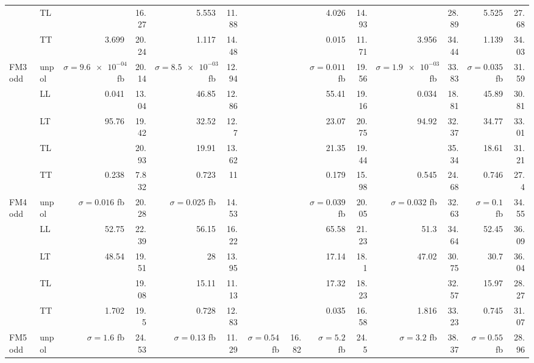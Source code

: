 \begin{table}[h]
{\begin{tabular}{llrrrrrrrrrrrr}
 & TL &  & \num{16.27} & \num{5.553} & \num{11.88} &  &  & \num{4.026} & \num{14.93} &  & \num{28.89} & \num{5.525} & \num{27.68} \\
 & TT & \num{3.699} & \num{20.24} & \num{1.117} & \num{14.48} &  &  & \num{0.015} & \num{11.71} & \num{3.956} & \num{34.44} & \num{1.139} & \num{34.03} \\
\midrule
\multirow{5}{*}{FM3odd}
 & unpol & $\sigma = \num{9.6e-04}$ fb & \num{20.14} & $\sigma = \num{8.5e-03}$ fb & \num{12.94} &  &  & $\sigma = \num{0.011}$ fb & \num{19.56} & $\sigma = \num{1.9e-03}$ fb & \num{33.83} & $\sigma = \num{0.035}$ fb & \num{31.59} \\
 & LL & \num{0.041} & \num{13.04} & \num{46.85} & \num{12.86} &  &  & \num{55.41} & \num{19.16} & \num{0.034} & \num{18.81} & \num{45.89} & \num{30.81} \\
 & LT & \num{95.76} & \num{19.42} & \num{32.52} & \num{12.7} &  &  & \num{23.07} & \num{20.75} & \num{94.92} & \num{32.37} & \num{34.77} & \num{33.01} \\
 & TL &  & \num{20.93} & \num{19.91} & \num{13.62} &  &  & \num{21.35} & \num{19.44} &  & \num{35.34} & \num{18.61} & \num{31.21} \\
 & TT & \num{0.238} & \num{7.832} & \num{0.723} & \num{11} &  &  & \num{0.179} & \num{15.98} & \num{0.545} & \num{24.68} & \num{0.746} & \num{27.4} \\
\midrule
\multirow{5}{*}{FM4odd}
 & unpol & $\sigma = \num{0.016}$ fb & \num{20.28} & $\sigma = \num{0.025}$ fb & \num{14.53} &  &  & $\sigma = \num{0.039}$ fb & \num{20.05} & $\sigma = \num{0.032}$ fb & \num{32.63} & $\sigma = \num{0.1}$ fb & \num{34.55} \\
 & LL & \num{52.75} & \num{22.39} & \num{56.15} & \num{16.22} &  &  & \num{65.58} & \num{21.23} & \num{51.3} & \num{34.64} & \num{52.45} & \num{36.09} \\
 & LT & \num{48.54} & \num{19.51} & \num{28} & \num{13.95} &  &  & \num{17.14} & \num{18.1} & \num{47.02} & \num{30.75} & \num{30.7} & \num{36.04} \\
 & TL &  & \num{19.08} & \num{15.11} & \num{11.13} &  &  & \num{17.32} & \num{18.23} &  & \num{32.57} & \num{15.97} & \num{28.27} \\
 & TT & \num{1.702} & \num{19.5} & \num{0.728} & \num{12.83} &  &  & \num{0.035} & \num{16.58} & \num{1.816} & \num{33.23} & \num{0.745} & \num{31.07} \\
\midrule
\multirow{5}{*}{FM5odd}
 & unpol & $\sigma = \num{1.6}$ fb & \num{24.53} & $\sigma = \num{0.13}$ fb & \num{11.29} & $\sigma = \num{0.54}$ fb & \num{16.82} & $\sigma = \num{5.2}$ fb & \num{24.5} & $\sigma = \num{3.2}$ fb & \num{38.37} & $\sigma = \num{0.55}$ fb & \num{28.96} \\

\end{tabular}}
\end{table}
